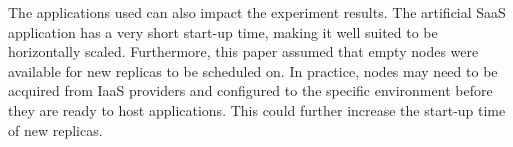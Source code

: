 The applications used can also impact the experiment results. The artificial SaaS application has a very short start-up time, making it well suited to be horizontally scaled. Furthermore, this paper assumed that empty nodes were available for new replicas to be scheduled on. In practice, nodes may need to be acquired from IaaS providers and configured to the specific environment before they are ready to host applications. This could further increase the start-up time of new replicas. 